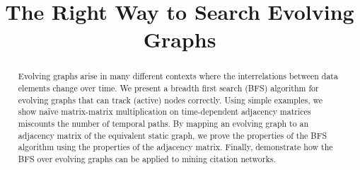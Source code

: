 \documentclass[10pt,conference,compsocconf]{IEEEtran}
\theoremstyle{definition}
\begin{document}
%
\title{The Right Way to Search Evolving Graphs}


\author{
\and
{}
}

\maketitle

\begin{abstract}
Evolving graphs arise in many different contexts where the
interrelations between data elements change over time.
We present a breadth first search (BFS) algorithm for evolving graphs
that can track (active) nodes correctly.
Using simple examples, we show na\"ive matrix-matrix multiplication on
time-dependent adjacency matrices miscounts the number of temporal paths.
By mapping an evolving graph to an adjacency matrix of the equivalent static graph,
we prove the properties of the BFS algorithm using the properties of the
adjacency matrix. Finally, demonstrate how the BFS over evolving graphs can be
applied to mining citation networks.

\end{abstract}
\end{document}
